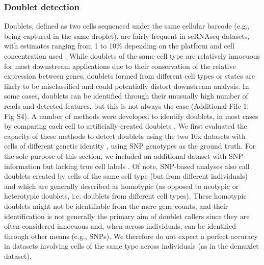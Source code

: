 \documentclass{bmcart}
\begin{document}
\subsubsection*{Doublet detection}

Doublets, defined as two cells sequenced under the same cellular barcode (e.g., being captured in the same droplet), are fairly frequent in scRNAseq datasets, with estimates ranging from 1 to 10\% depending on the platform and cell concentration used \cite{bloomEstimating2018,kangMultiplexedDemuxlet2018}. While doublets of the same cell type are relatively innocuous for most downstream applications due to their conservation of the relative expression between genes, doublets formed from different cell types or states are likely to be misclassified and could potentially distort downstream analysis. In some cases, doublets can be identified through their unusually high number of reads and detected features, but this is not always the case (Additional File 1: Fig S4). A number of methods were developed to identify doublets, in most cases by comparing each cell to artificially-created doublets \cite{mcginnisDoubletfinder2019, LunScran2016, BaisScds2019}. We first evaluated the capacity of these methods to detect doublets using the two 10x datasets with cells of different genetic identity \cite{tianMixology2018}, using SNP genotypes as the ground truth. For the sole purpose of this section, we included an additional dataset with SNP information but lacking true cell labels \cite{kangMultiplexedDemuxlet2018}. Of note, SNP-based analyses also call doublets created by cells of the same cell type (but from different individuals) and which are generally described as homotypic (as opposed to neotypic or heterotypic doublets, i.e. doublets from different cell types). These homotypic doublets might not be identifiable from the mere gene counts, and their identification is not generally the primary aim of doublet callers since they are often considered innocuous and, when across individuals, can be identified through other means (e.g., SNPs). We therefore do not expect a perfect accuracy in datasets involving cells of the same type across individuals (as in the demuxlet dataset).
\end{document}
